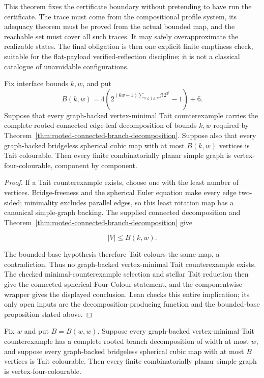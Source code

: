 This theorem fixes the certificate boundary without pretending to have run
the certificate.  The trace must come from the compositional profile system,
its adequacy theorem must be proved from the actual bounded map, and the
reachable set must cover all such traces.  It may safely overapproximate the
realizable states.  The final obligation is then one explicit finite
emptiness check, suitable for the flat-payload verified-reflection discipline;
it is not a classical catalogue of unavoidable configurations.

\begin{theorem}
\label{thm:spherical-reductive-assembly}
Fix interface bounds $k,w$, and put
\[
 B(k,w)=4\left(2^{(6w+1)
   \sum_{0\le j\le k}j!\,2^{3^j}}-1\right)+6.
\]
Suppose that every graph-backed vertex-minimal Tait counterexample carries
the complete rooted connected edge-leaf decomposition of bounds $k,w$
required by Theorem~\ref{thm:rooted-connected-branch-decomposition}.
Suppose also that every graph-backed bridgeless spherical cubic map with at
most $B(k,w)$ vertices is Tait colourable.  Then every finite combinatorially
planar simple graph is vertex-four-colourable, component by component.
\end{theorem}

\begin{proof}
If a Tait counterexample exists, choose one with the least number of
vertices.  Bridge-freeness and the spherical Euler equation make every edge
two-sided; minimality excludes parallel edges, so this least rotation map has
a canonical simple-graph backing.  The supplied connected decomposition and
Theorem~\ref{thm:rooted-connected-branch-decomposition} give

\[
                         |V|\le B(k,w).
\]

The bounded-base hypothesis therefore Tait-colours the same map, a
contradiction.  Thus no graph-backed vertex-minimal Tait counterexample
exists.  The checked minimal-counterexample selection and stellar Tait
reduction then give the connected spherical Four-Colour statement, and the
componentwise wrapper gives the displayed conclusion.  Lean checks this
entire implication; its only open inputs are the decomposition-producing
function and the bounded-base proposition stated above.
\end{proof}

\begin{corollary}
\label{cor:factored-bounded-width-assembly}
Fix $w$ and put $B=B(w,w)$.  Suppose every graph-backed vertex-minimal
Tait counterexample has a complete rooted branch decomposition of width at
most $w$, and suppose every graph-backed bridgeless spherical cubic map with
at most $B$ vertices is Tait colourable.  Then every finite combinatorially
planar simple graph is vertex-four-colourable.
\end{corollary}


